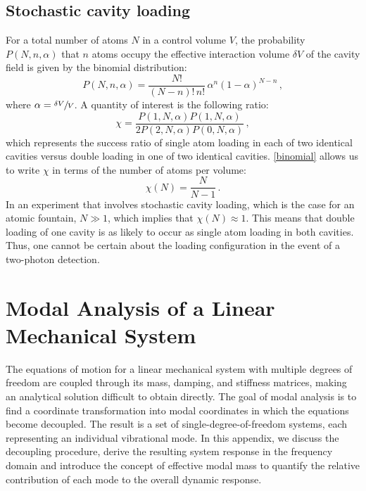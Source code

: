 \documentclass[../Thesis-IJspeert.tex]{subfiles}
\begin{document}
\section{Stochastic cavity loading}
\label{app:stochasticcavityloading}
For a total number of atoms $N$ in a control volume $V$, the probability $P(N,n,\alpha)$ that $n$ atoms occupy the effective interaction volume $\delta V$ of the cavity field is given by the binomial distribution:
\begin{equation}
\label{binomial}
P(N,n,\alpha)=\frac{N!}{\left(N-n\right)!\,n!}\,\alpha^n\left(1-\alpha\right)^{N-n}\,,
\end{equation}
where $\alpha=\sfrac{\delta V}{V}$. A quantity of interest is the following ratio:
\begin{equation}
\label{successratio}
\chi=\frac{P(1,N,\alpha) P(1,N,\alpha)}{2 P(2,N,\alpha) P(0,N,\alpha)}\,,
\end{equation}
which represents the success ratio of single atom loading in each of two identical cavities versus double loading in one of two identical cavities. \autoref{binomial} allows us to write $\chi$ in terms of the number of atoms per volume:
\begin{equation}
\chi(N)=\frac{N}{N-1}\,.
\end{equation}
In an experiment that involves stochastic cavity loading, which is the case for an atomic fountain, $N\gg1$, which implies that $\chi(N)\approx1$. This means that double loading of one cavity is as likely to occur as single atom loading in both cavities. Thus, one cannot be certain about the loading configuration in the event of a two-photon detection.

\chapter{Modal Analysis of a Linear Mechanical System}
\label{app:modalanalysis}
The equations of motion for a linear mechanical system with multiple degrees of freedom are coupled through its mass, damping, and stiffness matrices, making an analytical solution difficult to obtain directly. The goal of modal analysis is to find a coordinate transformation into modal coordinates in which the equations become decoupled. The result is a set of single-degree-of-freedom systems, each representing an individual vibrational mode. In this appendix, we discuss the decoupling procedure, derive the resulting system response in the frequency domain and introduce the concept of effective modal mass to quantify the relative contribution of each mode to the overall dynamic response.
\end{document}
